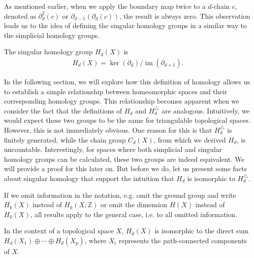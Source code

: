 As mentioned earlier, when we apply the boundary map twice to a \( d \)-chain \( c \), denoted as \( \partial^{2}_d(c) \) or \( \partial_{d-1}(\partial_{d}(c)) \), the result is always zero. This observation leads us to the idea of defining the singular homology groups in a similar way to the simplicial homology groups.

\begin{definition}
	The singular homology group \( H_{d}(X) \) is
	\begin{align}
		H_{d}(X) = \ker(\partial_{d}) / \operatorname{im}(\partial_{d+1}). 
	\end{align}
\end{definition}

In the following section, we will explore how this definition of homology allows us to establish a simple relationship between homeomorphic spaces and their corresponding homology groups. This relationship becomes apparent when we consider the fact that the definitions of \( H_{d} \) and \( H^{\triangle}_{d} \) are analogous. Intuitively, we would expect these two groups to be the same for triangulable topological spaces. However, this is not immediately obvious. One reason for this is that \( H^{\triangle}_{d} \) is finitely generated, while the chain group \( C_{d}(X) \), from which we derived \( H_{d} \), is uncountable. Interestingly, for spaces where both simplicial and singular homology groups can be calculated, these two groups are indeed equivalent. We will provide a proof for this later on. But before we do, let us present some facts about singular homology that support the intuition that \( H_{d} \) is isomorphic to \( H^{\triangle}_{d} \).

\begin{remark}
If we omit information in the notation, e.g. omit the ground group and write $H_k(X)$ instead of $H_k(X;\mathbb{Z})$ or omit the dimension $H(X)$ instead of $H_k(X)$, all results apply to the general case, i.e. to all omitted information.
\end{remark}

\begin{proposition}{\cite[Proposition 2.6]{hatcher2005algebraic}}
	In the context of a topological space \( X \), \( H_{d}(X) \) is isomorphic to the direct sum \( H_{d}(X_{1}) \oplus \cdots \oplus H_{d}(X_{p}) \), where \( X_{i} \) represents the path-connected components of \( X \).
\end{proposition}


